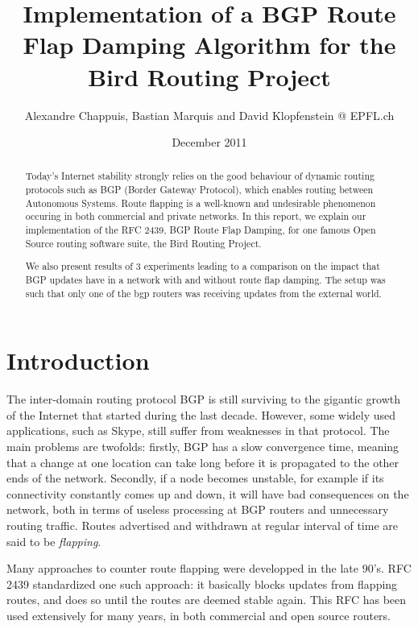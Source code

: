 \documentclass[a4paper,english]{IEEEtran}
\begin{document}
\date{December 2011}

\author{Alexandre Chappuis, Bastian Marquis and David Klopfenstein @ EPFL.ch}

\title{Implementation of a BGP Route Flap Damping Algorithm for the Bird
Routing Project}

\maketitle

\begin{abstract}
Today's Internet stability strongly relies on the good behaviour of
dynamic routing protocols such as BGP (Border Gateway Protocol), which
enables routing between Autonomous Systems. Route flapping is a well-known
and undesirable phenomenon occuring in both commercial and private
networks. In this report, we explain our implementation of the RFC
2439, BGP Route Flap Damping, for one famous Open Source routing software
suite, the Bird Routing Project.

We also present results of 3 experiments leading to a comparison on the impact that
BGP updates have in a network with and without route flap damping. The setup was
such that only one of the bgp routers was receiving updates from the external world.
\end{abstract}

\section{Introduction}

The inter-domain routing protocol BGP is still surviving to the gigantic
growth of the Internet that started during the last decade. However,
some widely used applications, such as Skype, still suffer from weaknesses
in that protocol. The main problems are twofolds: firstly, BGP has
a slow convergence time, meaning that a change at one location can take
long before it is propagated to the other ends of the network.
Secondly, if a node becomes unstable, for example if its connectivity
constantly comes up and down, it will have bad consequences on the
network, both in terms of useless processing at BGP routers and unnecessary
routing traffic. Routes advertised and withdrawn at regular interval
of time are said to be \textit{flapping}.

Many approaches to counter route flapping were developped in
the late 90's. RFC 2439\cite{rfc2439} standardized one such approach:
it basically blocks updates from flapping routes, and does so until
the routes are deemed stable again. This RFC has been used extensively
for many years, in both commercial and open source routers.
\end{document}
